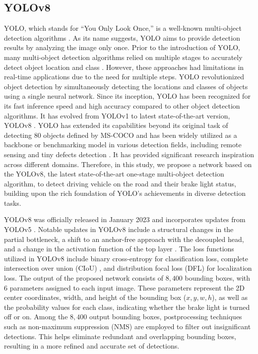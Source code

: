 \subsection{YOLOv8}
YOLO, which stands for ``You Only Look Once,'' is a well-known multi-object detection algorithms \cite{redmon2016you}.
As its name suggests, YOLO aims to provide detection results by analyzing the image only once. 
Prior to the introduction of YOLO, many multi-object detection algorithms relied on multiple stages to accurately detect object location and class \cite{girshick2014rich, he2015spatial, girshick2015fast, ren2015faster}.
However, these approaches had limitations in real-time applications due to the need for multiple steps.
YOLO revolutionized object detection by simultaneously detecting the locations and classes of objects using a single neural network.
Since its inception, YOLO has been recognized for its fast inference speed and high accuracy compared to other object detection algorithms.
It has evolved from YOLOv1 to latest state-of-the-art version, YOLOv8 \cite{redmon2016you, redmon2017yolo9000, redmon2018yolov3, bochkovskiy2020yolov4, YOLOv5, li2022yolov6, wang2023yolov7, YOLOv8}.
YOLO has extended its capabilities beyond its original task of detecting $80$ objects defined by MS-COCO \cite{lin2014microsoft} and has been widely utilized as a backbone or benchmarking model in various detection fields, including remote sensing \cite{ye2022adaptive} and tiny defects detection \cite{zeng2022small}.
It has provided significant research inspiration across different domains.
Therefore, in this study, we propose a network based on the YOLOv8, the latest state-of-the-art one-stage multi-object detection algorithm, to detect driving vehicle on the road and their brake light status, building upon the rich foundation of YOLO's achievements in diverse detection tasks.

YOLOv8 \cite{YOLOv8} was officially released in January 2023 and incorporates updates from YOLOv5 \cite{YOLOv5}.
Notable updates in YOLOv8 include a structural changes in the partial bottleneck, a shift to an anchor-free approach with the decoupled head, and a change in the activation function of the top layer \cite{terven2023comprehensive}.
The loss functions utilized in YOLOv8 include binary cross-entropy for classification loss, complete intersection over union (CIoU) \cite{zheng2020distance}, and distribution focal loss (DFL) \cite{li2020generalized} for localization loss.
The output of the proposed network consists of $8,400$ bounding boxes, with $6$ parameters assigned to each input image.
These parameters represent the 2D center coordinates, width, and height of the bounding box ($x, y, w, h$), as well as the probability values for each class, indicating whether the brake light is turned off or on. 
Among the $8,400$ output bounding boxes, postprocessing techniques such as non-maximum suppression (NMS) are employed to filter out insignificant detections.
This helps eliminate redundant and overlapping bounding boxes, resulting in a more refined and accurate set of detections.

